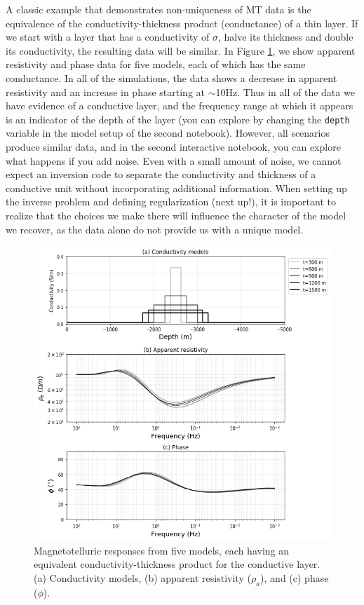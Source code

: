 \documentclass[11pt,oneside]{article}
\begin{document}
A classic example that demonstrates non-uniqueness of MT data is the equivalence of the   conductivity-thickness product (conductance) of a thin layer. If we start with a layer that has a conductivity of $\sigma$, halve its thickness and double its conductivity, the resulting data will be similar. In Figure \ref{fig:sigmat}, we show apparent resistivity and phase data for five models, each of which has the same conductance. In all of the simulations, the data shows a decrease in apparent resistivity and an increase in phase starting at $\sim$10Hz. Thus in all of the data we have evidence of a conductive layer, and the frequency range at which it appears is an indicator of the depth of the layer (you can explore by changing the \texttt{depth} variable in the model setup of the second notebook). However, all scenarios produce similar data, and in the second interactive notebook, you can explore what happens if you add noise. Even with a small amount of noise, we cannot expect an inversion code to separate the conductivity and thickness of a conductive unit without incorporating additional information. When setting up the inverse problem and defining regularization (next up!), it is important to realize that the choices we make there will influence the character of the model we recover, as the data alone do not provide us with a unique model.

\begin{figure}[htb!]
    \centering
    \includegraphics[width=\textwidth]{images/sigmat.png}
\caption{Magnetotelluric responses from five models, each having an equivalent conductivity-thickness product for the conductive layer. (a) Conductivity models, (b) apparent resistivity ($\rho_a$), and (c) phase ($\phi$).}
\label{fig:sigmat}
\end{figure}
\end{document}
